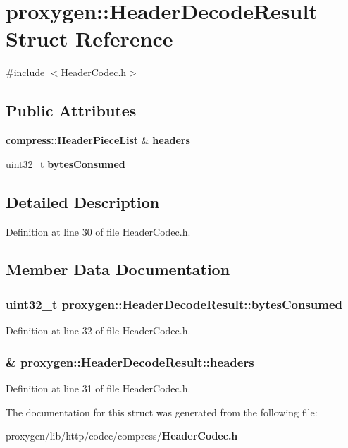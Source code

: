 \section{proxygen\+:\+:Header\+Decode\+Result Struct Reference}
\label{structproxygen_1_1HeaderDecodeResult}


{\ttfamily \#include $<$Header\+Codec.\+h$>$}

\subsection*{Public Attributes}
\begin{DoxyCompactItemize}
\item 
{\bf compress\+::\+Header\+Piece\+List} \& {\bf headers}
\item 
uint32\+\_\+t {\bf bytes\+Consumed}
\end{DoxyCompactItemize}


\subsection{Detailed Description}


Definition at line 30 of file Header\+Codec.\+h.



\subsection{Member Data Documentation}
\subsubsection[{bytes\+Consumed}]{\setlength{\rightskip}{0pt plus 5cm}uint32\+\_\+t proxygen\+::\+Header\+Decode\+Result\+::bytes\+Consumed}\label{structproxygen_1_1HeaderDecodeResult_af1deb4d93cf0f537051465e4f6d6c416}


Definition at line 32 of file Header\+Codec.\+h.

\subsubsection[{headers}]{\& proxygen\+::\+Header\+Decode\+Result\+::headers}\label{structproxygen_1_1HeaderDecodeResult_a677212f645ce90313f99fecc81add485}


Definition at line 31 of file Header\+Codec.\+h.



The documentation for this struct was generated from the following file\+:\begin{DoxyCompactItemize}
\item 
proxygen/lib/http/codec/compress/{\bf Header\+Codec.\+h}\end{DoxyCompactItemize}
